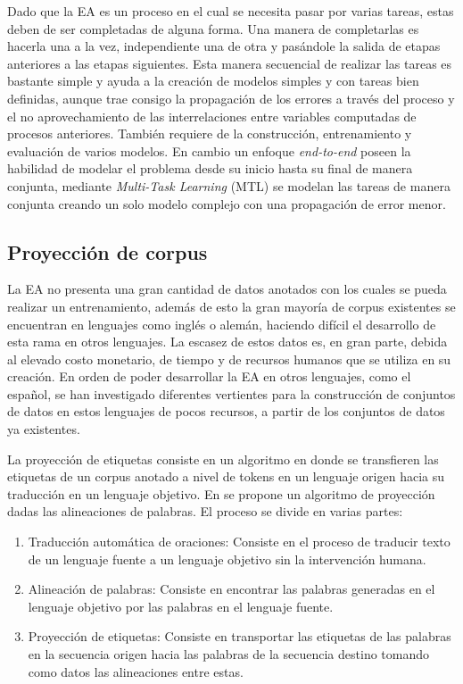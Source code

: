 \documentclass[a4paper,11pt,twocolumn,twoside]{article}
\begin{document}
Dado que la EA es un proceso en el cual se necesita pasar por varias tareas, estas deben de ser completadas
de alguna forma. Una manera de completarlas es hacerla una a la vez, independiente una de otra y pasándole
la salida de etapas anteriores a las etapas siguientes. Esta manera secuencial de realizar las 
tareas es bastante simple y ayuda a la creación de modelos simples y con tareas bien definidas, aunque trae consigo 
la propagación de los errores a través del proceso y el no aprovechamiento de las interrelaciones entre variables 
computadas de procesos anteriores. También requiere de la construcción, entrenamiento y evaluación de varios modelos.
En cambio un enfoque \textit{end-to-end} poseen la habilidad de modelar el problema 
desde su inicio hasta su final de manera conjunta, mediante \textit{Multi-Task Learning} (MTL) se modelan
las tareas de manera conjunta creando un solo modelo complejo con una propagación de error menor.

\subsection{Proyección de corpus} %

La EA no presenta una gran cantidad de datos anotados con los cuales se pueda realizar 
un entrenamiento, además de esto la gran mayoría de corpus existentes se encuentran en lenguajes como inglés o alemán,
haciendo difícil el desarrollo de esta rama en otros lenguajes.
La escasez de estos datos es, en gran parte, debida al elevado costo monetario, de tiempo y de recursos humanos que se utiliza
en su creación. En orden de poder desarrollar la EA en otros lenguajes, como el español, se han investigado diferentes vertientes
para la construcción de conjuntos de datos en estos lenguajes de pocos recursos, a partir de los conjuntos de datos ya 
existentes.

La proyección de etiquetas consiste en un algoritmo en donde se 
transfieren las etiquetas de un corpus anotado a nivel de tokens en un lenguaje origen hacia su traducción en un
lenguaje objetivo. En \cite{eger2018cross} se propone un algoritmo de proyección dadas las alineaciones de 
palabras. El proceso se divide en varias partes:

\begin{enumerate}
	\item Traducción automática de oraciones: Consiste en el proceso de
	traducir texto de un lenguaje fuente a un lenguaje objetivo sin la intervención humana.
	\item Alineación de palabras: Consiste en encontrar las palabras generadas en el lenguaje objetivo por las 
	palabras en el lenguaje fuente.
	\item Proyección de etiquetas: Consiste en transportar las etiquetas de las palabras en la secuencia origen
	hacia las palabras de la secuencia destino tomando como datos las alineaciones entre estas.
\end{enumerate}
\end{document}
